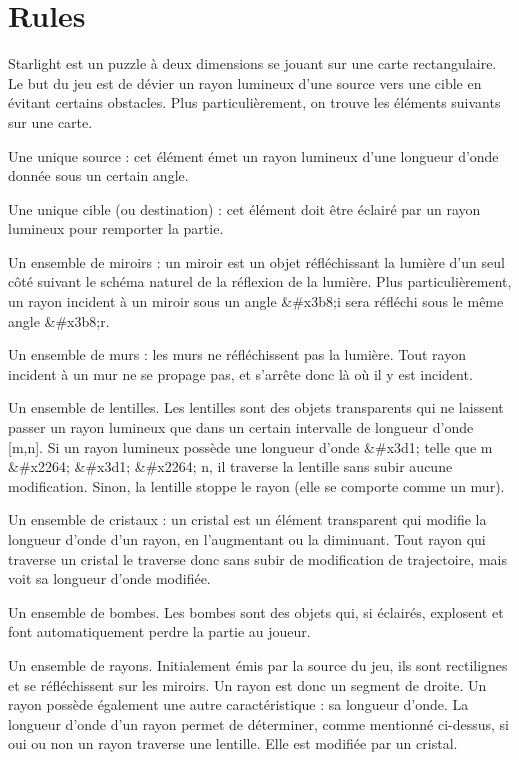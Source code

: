 \section*{Rules}

Starlight est un puzzle à deux dimensions se jouant sur une carte rectangulaire. Le but du jeu est de dévier un rayon lumineux d'une source vers une cible en évitant certains obstacles. Plus particulièrement, on trouve les éléments suivants sur une carte.


\begin{DoxyItemize}
\item Une unique source \+: cet élément émet un rayon lumineux d'une longueur d'onde donnée sous un certain angle.
\item Une unique cible (ou destination) \+: cet élément doit être éclairé par un rayon lumineux pour remporter la partie.
\item Un ensemble de miroirs \+: un miroir est un objet réfléchissant la lumière d'un seul côté suivant le schéma naturel de la réflexion de la lumière. Plus particulièrement, un rayon incident à un miroir sous un angle \&\#x3b8;i sera réfléchi sous le même angle \&\#x3b8;r.
\item Un ensemble de murs \+: les murs ne réfléchissent pas la lumière. Tout rayon incident à un mur ne se propage pas, et s'arrête donc là où il y est incident.
\item Un ensemble de lentilles. Les lentilles sont des objets transparents qui ne laissent passer un rayon lumineux que dans un certain intervalle de longueur d'onde \mbox{[}m,n\mbox{]}. Si un rayon lumineux possède une longueur d'onde \&\#x3d1; telle que m \&\#x2264; \&\#x3d1; \&\#x2264; n, il traverse la lentille sans subir aucune modification. Sinon, la lentille stoppe le rayon (elle se comporte comme un mur).
\item Un ensemble de cristaux \+: un cristal est un élément transparent qui modifie la longueur d'onde d'un rayon, en l'augmentant ou la diminuant. Tout rayon qui traverse un cristal le traverse donc sans subir de modification de trajectoire, mais voit sa longueur d'onde modifiée.
\item Un ensemble de bombes. Les bombes sont des objets qui, si éclairés, explosent et font automatiquement perdre la partie au joueur.
\item Un ensemble de rayons. Initialement émis par la source du jeu, ils sont rectilignes et se réfléchissent sur les miroirs. Un rayon est donc un segment de droite. Un rayon possède également une autre caractéristique \+: sa longueur d'onde. La longueur d'onde d'un rayon permet de déterminer, comme mentionné ci-\/dessus, si oui ou non un rayon traverse une lentille. Elle est modifiée par un cristal.
\end{DoxyItemize}

